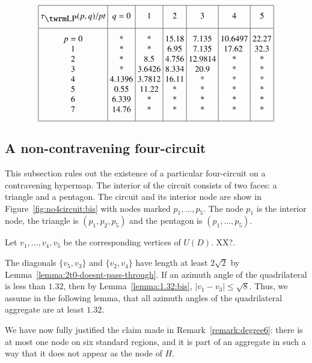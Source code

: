 \begin{equation}
\vbox{\offinterlineskip \hrule
\halign{&\vrule#&\strut\ \hfil#\hfil\ \cr   %
height 7pt&\omit&&\omit&&\omit&&\omit&&\omit&&\omit&&\omit&\cr
&\hfil $\tlp(p,q)/\pt$\hfil
        &&\hfil $q=0$\hfil
        &&\hfil1\hfil
        &&\hfil2\hfil
        &&\hfil3\hfil
        &&\hfil4\hfil
        &&\hfil5\hfil&
\cr height 7pt&\omit&&\omit&&\omit&&\omit&&\omit&&\omit&&\omit&\cr
\noalign{\hrule}
height7pt&\omit&&\omit&&\omit&&\omit&&\omit&&\omit&&\omit&\cr
&$p=0$&& *&& *&& 15.18&& 7.135&& 10.6497&& 22.27&\cr &1&&    *&& *&&
6.95&& 7.135&&17.62  && 32.3&\cr &2&&    *&&
8.5&&4.756&&12.9814&&*&&*&\cr &3&& *&& 3.6426&&8.334&&20.9&&*&&*&\cr
&4&&4.1396&&3.7812&&16.11&&*&&*&&*&\cr
&5&&0.55&&11.22&&*&&*&&*&&*&\cr &6&&6.339&&*&&*&&*&&*&&*&\cr
&7&&14.76&&*&&*&&*&&*&&*&\cr
height7pt&\omit&&\omit&&\omit&&\omit&&\omit&&\omit&&\omit&\cr}
\hrule }
    \label{eqn:old5.1:bis}
\end{equation}



\subsection{A non-contravening four-circuit}
\label{sec:impossible-circuit}

This subsection rules out the existence of a particular four-circuit
on a contravening hypermap.  The interior of the circuit consists of
two faces: a triangle and a pentagon.  The circuit and its interior
node are show in Figure~\ref{fig:no4circuit:bis} with nodes marked
$p_1,\ldots,p_5$. The node $p_1$ is the interior node, the triangle
is $(p_1,p_2,p_5)$ and the pentagon is $(p_1,\ldots,p_5)$.


Let $v_1,\ldots,v_4,v_5$ be the corresponding vertices of $U(D)$.
XX?.

The diagonals $\{v_5,v_3\}$ and $\{v_2,v_4\}$ have length at least
$2\sqrt2$ by Lemma~\ref{lemma:2t0-doesnt-pass-through}.  If an
azimuth angle of the  quadrilateral is less than $1.32$, then by
Lemma~\ref{lemma:1.32:bis},  $|v_1-v_3|\le\sqrt{8}$.  Thus, we
assume in the following lemma, that all azimuth angles of the
quadrilateral aggregate are at least $1.32$.


\begin{remark}
We have now fully justified the claim made in
Remark~\ref{remark:degree6}: there is at most one node on six
standard regions, and it is part of an aggregate in such a way that
it does not appear as the node of $H$.
\end{remark}

